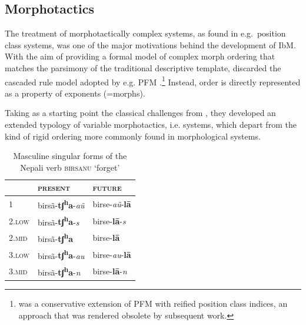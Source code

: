 \documentclass[output=paper
                ,modfonts
                ,nonflat
	        ,collection
	        ,collectionchapter
	        ,collectiontoclongg
 	        ,biblatex
                ,babelshorthands
                ,newtxmath
                ,draftmode
                ,colorlinks, citecolor=brown
] {langscibook}
\begin{document}
{\subsection{Morphotactics}
\label{sec:Mortax}

The treatment of morphotactically complex systems, as found in e.g.\
position class systems, was one of the major motivations behind the
development of IbM. With the aim of providing a formal model of
complex morph ordering that matches the parsimony of the traditional
descriptive template, \citet{Crysmann:Bonami:2016} discarded the
cascaded rule model adopted by e.g. PFM
\citep{Stump01}.\footnote{\citet{Crysmann12} was a conservative
  extension of PFM with reified position class indices, an approach
  that was rendered obsolete by subsequent work.} Instead, order is
directly represented as a property of exponents (=morphs).

Taking as a starting point  the classical challenges from \citet{Stump93},
they developed an extended typology of variable morphotactics,
i.e. systems, which depart from the kind of rigid ordering more
commonly found in morphological systems.

\begin{table}[ht!]
  \begin{center}
    \begin{tabular}{lll}
      \toprule
      & \textsc{present} & \textsc{future}\\
      \midrule
      1 & birsã-\textbf{tʃ\textsuperscript{h}a}-\emph{aũ} & 
                                                                birse-\emph{aũ}-\textbf{lā}\\
      \textsc{2.low} &
                 birsã-\textbf{tʃ\textsuperscript{h}a}-\emph{s} & 
                                                                      birse-\textbf{lā}-\emph{s}\\
      \textsc{2.mid} & 
                  birsã-\textbf{tʃ\textsuperscript{h}a} & 
                                                         birse-\textbf{lā}\\
      \textsc{3.low} & 
                  birsã-\textbf{tʃ\textsuperscript{h}a}-\emph{au} & 
                                                                        birse-\emph{au}-\textbf{lā}\\
      \textsc{3.mid} &
                 birsã-\textbf{tʃ\textsuperscript{h}a}-\emph{n} & 
                                                                      birse-\textbf{lā}-\emph{n}\\
      \bottomrule
    \end{tabular}
  \end{center}
  \caption{Masculine singular forms of the Nepali verb \textsc{birsanu} ‘forget’}
  \label{tab:Nepali}
\end{table}

}
\end{document}
